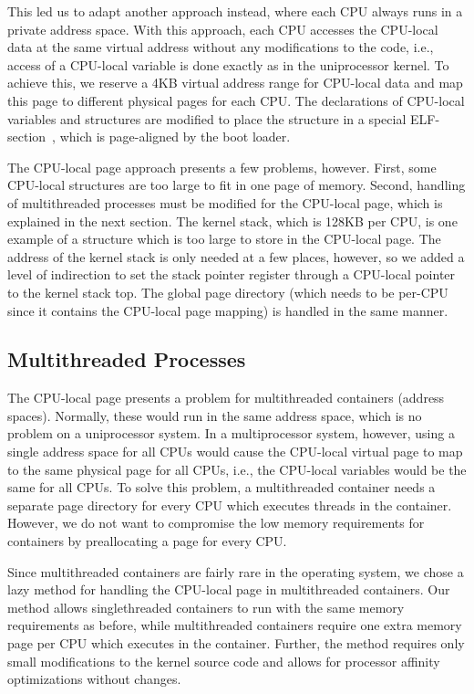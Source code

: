 This led us to adapt another approach instead, where each CPU always runs in a
private address space. With this approach, each CPU accesses the CPU-local
data at the same virtual address without any modifications to the code, i.e.,
access of a CPU-local variable is done exactly as in the uniprocessor kernel.
To achieve this, we reserve a 4KB virtual address range for CPU-local data and
map this page to different physical pages for each CPU.  The declarations of
CPU-local variables and structures are modified to place the structure in a
special ELF-section~\cite{elf}, which is page-aligned by the boot loader.

The CPU-local page approach presents a few problems, however. First, some
CPU-local structures are too large to fit in one page of memory. Second,
handling of multithreaded processes must be modified for the CPU-local page,
which is explained in the next section. The kernel stack, which is 128KB per
CPU, is one example of a structure which is too large to store in the
CPU-local page.  The address of the kernel stack is only needed at a few
places, however, so we added a level of indirection to set the stack pointer
register through a CPU-local pointer to the kernel stack top. The global page
directory (which needs to be per-CPU since it contains the CPU-local page
mapping) is handled in the same manner.


\subsection{Multithreaded Processes}
The CPU-local page presents a problem for multithreaded containers (address
spaces).  Normally, these would run in the same address space, which is no
problem on a uniprocessor system. In a multiprocessor system, however, using a
single address space for all CPUs would cause the CPU-local virtual page to
map to the same physical page for all CPUs, i.e., the CPU-local variables
would be the same for all CPUs. To solve this problem, a multithreaded
container needs a separate page directory for every CPU which executes threads
in the container. However, we do not want to compromise the low memory
requirements for containers by preallocating a page for every CPU.

Since multithreaded containers are fairly rare in the operating system, we
chose a lazy method for handling the CPU-local page in multithreaded
containers. Our method allows singlethreaded containers to run with the same
memory requirements as before, while multithreaded containers require one
extra memory page per CPU which executes in the container. Further, the method
requires only small modifications to the kernel source code and allows for
processor affinity optimizations without changes.

